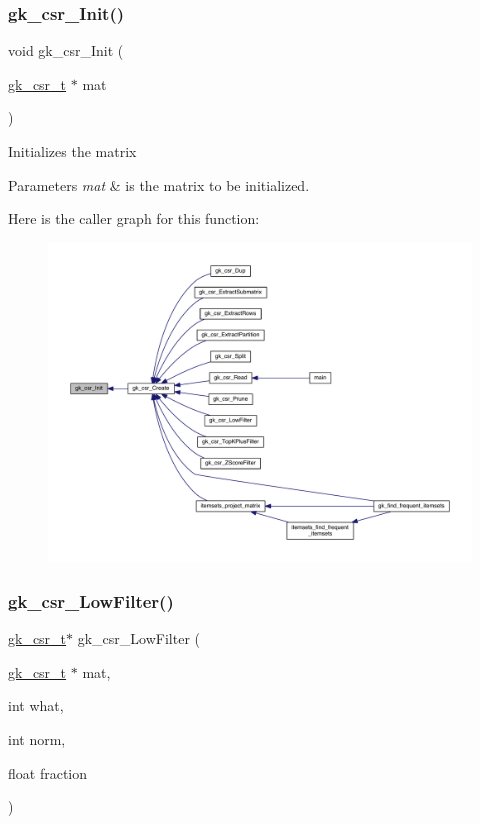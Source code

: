 \subsubsection{\texorpdfstring{gk\+\_\+csr\+\_\+\+Init()}{gk\_csr\_Init()}}
{\footnotesize\ttfamily void gk\+\_\+csr\+\_\+\+Init (\begin{DoxyParamCaption}\item[{\hyperlink{a00634}{gk\+\_\+csr\+\_\+t} $\ast$}]{mat }\end{DoxyParamCaption})}

Initializes the matrix 
\begin{DoxyParams}{Parameters}
{\em mat} & is the matrix to be initialized. \\
\hline
\end{DoxyParams}
Here is the caller graph for this function\+:\nopagebreak
\begin{figure}[H]
\begin{center}
\leavevmode
\includegraphics[width=350pt]{a00077_a47a303d88c3316bd821219cae39d0461_icgraph}
\end{center}
\end{figure}
\mbox{\label{a00077_a66729af11e7dee3585d6191661757c37}} 
\subsubsection{\texorpdfstring{gk\+\_\+csr\+\_\+\+Low\+Filter()}{gk\_csr\_LowFilter()}}
{\footnotesize\ttfamily \hyperlink{a00634}{gk\+\_\+csr\+\_\+t}$\ast$ gk\+\_\+csr\+\_\+\+Low\+Filter (\begin{DoxyParamCaption}\item[{\hyperlink{a00634}{gk\+\_\+csr\+\_\+t} $\ast$}]{mat,  }\item[{int}]{what,  }\item[{int}]{norm,  }\item[{float}]{fraction }\end{DoxyParamCaption})}


